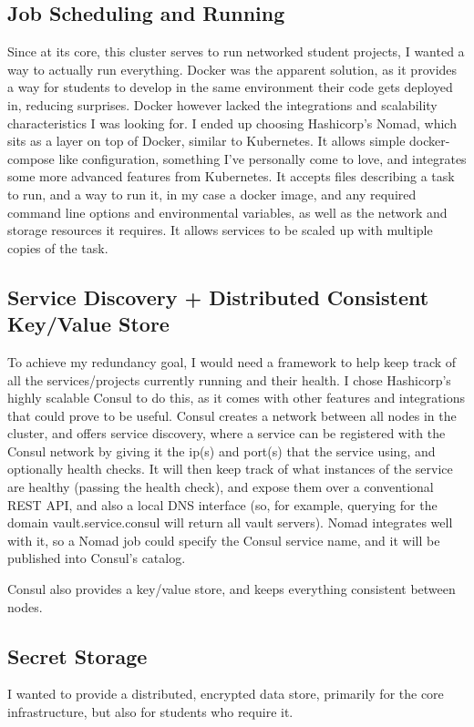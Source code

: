 \documentclass{article}
\begin{document}
\subsection{Job Scheduling and Running}
Since at its core, this cluster serves to run networked student projects, I wanted a way to actually run everything. Docker was the apparent solution, as it provides a way for students to develop in the same environment their code gets deployed in, reducing surprises. Docker however lacked the integrations and scalability characteristics I was looking for. I ended up choosing Hashicorp's Nomad, which sits as a layer on top of Docker, similar to Kubernetes. It allows simple docker-compose like configuration, something I've personally come to love, and integrates some more advanced features from Kubernetes. It accepts files describing a task to run, and a way to run it, in my case a docker image, and any required command line options and environmental variables, as well as the network and storage resources it requires. It allows services to be scaled up with multiple copies of the task.

\subsection{Service Discovery + Distributed Consistent Key/Value Store}
To achieve my redundancy goal, I would need a framework to help keep track of all the services/projects currently running and their health. I chose Hashicorp's highly scalable Consul to do this, as it comes with other features and integrations that could prove to be useful. Consul creates a network between all nodes in the cluster, and offers service discovery, where a service can be registered with the Consul network by giving it the ip(s) and port(s) that the service using, and optionally health checks. It will then keep track of what instances of the service are healthy (passing the health check), and expose them over a conventional REST API, and also a local DNS interface (so, for example, querying for the domain vault.service.consul will return all vault servers). Nomad integrates well with it, so a Nomad job could specify the Consul service name, and it will be published into Consul's catalog.

Consul also provides a key/value store, and keeps everything consistent between nodes.

\subsection{Secret Storage}
I wanted to provide a distributed, encrypted data store, primarily for the core infrastructure, but also for students who require it. 
\end{document}
